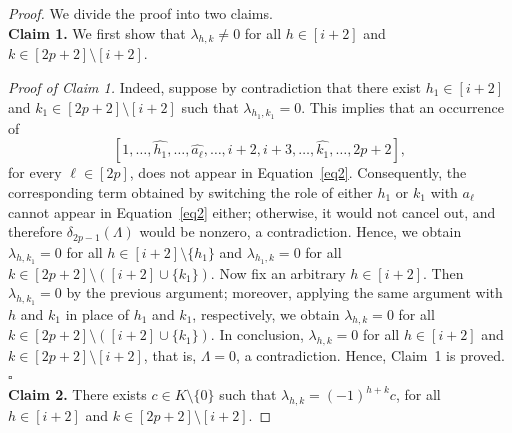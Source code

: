 \documentclass[12pt]{amsart}
\begin{document}
\begin{proof}
We divide the proof into two claims.\\

\textbf{Claim 1.} We first show that $\lambda_{h,k} \neq 0$ for all $h \in [i+2]$ and $k \in [2p+2]\setminus[i+2]$.

\textit{Proof of Claim 1.} Indeed, suppose by contradiction that there exist $h_1 \in [i+2]$ and $k_1 \in [2p+2]\setminus[i+2]$ such that $\lambda_{h_1,k_1}=0$. This implies that an occurrence of
\[
\left[1,\dots,\widehat{h_1},\dots,\widehat{a_\ell},\dots,i+2,i+3,\dots,\widehat{k_1},\dots,2p+2 \right],
\]
for every $\ell \in [2p]$, does not appear in Equation~\eqref{eq2}. Consequently, the corresponding term obtained by switching the role of either $h_1$ or $k_1$ with $a_\ell$ cannot appear in Equation~\eqref{eq2} either; otherwise, it would not cancel out, and therefore $\delta_{2p-1}(\Lambda)$ would be nonzero, a contradiction. Hence, we obtain $\lambda_{h,k_1}=0$ for all $h\in [i+2]\setminus \{h_1\}$ and $\lambda_{h_1,k}=0$ for all $k\in [2p+2]\setminus([i+2]\cup \{k_1\})$. Now fix an arbitrary $h\in [i+2]$. Then $\lambda_{h,k_1}=0$ by the previous argument; moreover, applying the same argument with $h$ and $k_1$ in place of $h_1$ and $k_1$, respectively, we obtain $\lambda_{h,k}=0$ for all $k\in [2p+2]\setminus([i+2]\cup \{k_1\})$. In conclusion, $\lambda_{h,k}=0$ for all $h\in [i+2]$ and $k\in [2p+2]\setminus[i+2]$, that is, $\Lambda=0$, a contradiction. Hence, Claim~1 is proved. $\square$\\


\textbf{Claim 2.} There exists $c\in K\setminus\{0\}$ such that $\lambda_{h,k} = (-1)^{h+k} c$, for all $h\in [i+2]$ and $k\in [2p+2]\setminus[i+2]$. 


\end{proof}
\end{document}
